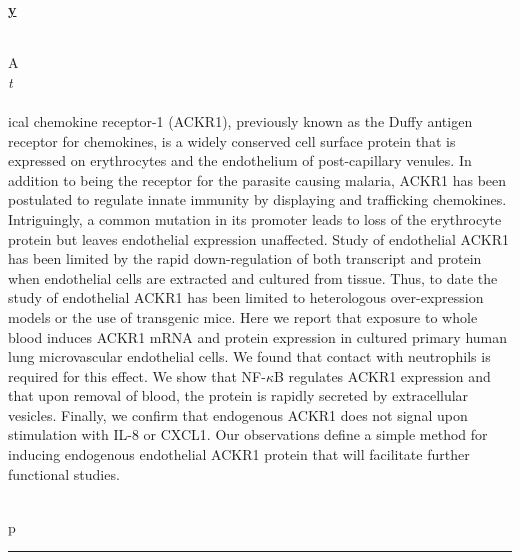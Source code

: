 \documentclass[titlepage,oneside,openany,10pt]{book}
\newenvironment{posterabswref}[5] %
        {
        \newcommand{\posterref}{#5}
	\begin{flushright}
                \underline{\textbf{#4}}
        \end{flushright}
        \textbf{#1}\\%
        #2\\%
        \textit{#3}\\\\%
        }
        {
        \vspace{0.5cm}
        \\\noindent \posterref \\ \noindent\rule{15cm}{0.5pt}%
        }
\begin{document}
\begin{posterabswref}
{	}
	Atypical chemokine receptor-1 (ACKR1), previously known as the Duffy antigen receptor for chemokines, is a widely conserved cell surface protein that is expressed on erythrocytes and the endothelium of post-capillary venules. In addition to being the receptor for the parasite causing malaria, ACKR1 has been postulated to regulate innate immunity by displaying and trafficking chemokines. Intriguingly, a common mutation in its promoter leads to loss of the erythrocyte protein but leaves endothelial expression unaffected. Study of endothelial ACKR1 has been limited by the rapid down-regulation of both transcript and protein when endothelial cells are extracted and cultured from tissue. Thus, to date the study of endothelial ACKR1 has been limited to heterologous over-expression models or the use of transgenic mice. Here we report that exposure to whole blood induces ACKR1 mRNA and protein expression in cultured primary human lung microvascular endothelial cells. We found that contact with neutrophils is required for this effect. We show that NF-$\kappa$B regulates ACKR1 expression and that upon removal of blood, the protein is rapidly secreted by extracellular vesicles. Finally, we confirm that endogenous ACKR1 does not signal upon stimulation with IL-8 or CXCL1. Our observations define a simple method for inducing endogenous endothelial ACKR1 protein that will facilitate further functional studies.
	\label{GuoX}
\end{posterabswref}

\newpage
\end{document}
